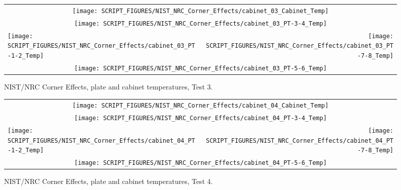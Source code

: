 \begin{figure}[p]
\begin{tabular*}{\textwidth}{l@{\extracolsep{\fill}}r}
\multicolumn{2}{c}{\texttt{[image: SCRIPT\_FIGURES/NIST\_NRC\_Corner\_Effects/cabinet\_03\_Cabinet\_Temp]}} \\
\multicolumn{2}{c}{\texttt{[image: SCRIPT\_FIGURES/NIST\_NRC\_Corner\_Effects/cabinet\_03\_PT-3-4\_Temp]}} \\
\texttt{[image: SCRIPT\_FIGURES/NIST\_NRC\_Corner\_Effects/cabinet\_03\_PT-1-2\_Temp]} &
\texttt{[image: SCRIPT\_FIGURES/NIST\_NRC\_Corner\_Effects/cabinet\_03\_PT-7-8\_Temp]} \\
\multicolumn{2}{c}{\texttt{[image: SCRIPT\_FIGURES/NIST\_NRC\_Corner\_Effects/cabinet\_03\_PT-5-6\_Temp]}}
\end{tabular*}
\caption[NIST/NRC Corner Effects, plate and cabinet temperatures, Test 3]{NIST/NRC Corner Effects, plate and cabinet temperatures, Test 3.}
\label{NIST_NRC_Cabinet_PT_Test_3}
\end{figure}

\begin{figure}[p]
\begin{tabular*}{\textwidth}{l@{\extracolsep{\fill}}r}
\multicolumn{2}{c}{\texttt{[image: SCRIPT\_FIGURES/NIST\_NRC\_Corner\_Effects/cabinet\_04\_Cabinet\_Temp]}} \\
\multicolumn{2}{c}{\texttt{[image: SCRIPT\_FIGURES/NIST\_NRC\_Corner\_Effects/cabinet\_04\_PT-3-4\_Temp]}} \\
\texttt{[image: SCRIPT\_FIGURES/NIST\_NRC\_Corner\_Effects/cabinet\_04\_PT-1-2\_Temp]} &
\texttt{[image: SCRIPT\_FIGURES/NIST\_NRC\_Corner\_Effects/cabinet\_04\_PT-7-8\_Temp]} \\
\multicolumn{2}{c}{\texttt{[image: SCRIPT\_FIGURES/NIST\_NRC\_Corner\_Effects/cabinet\_04\_PT-5-6\_Temp]}}
\end{tabular*}
\caption[NIST/NRC Corner Effects, plate and cabinet temperatures, Test 4]{NIST/NRC Corner Effects, plate and cabinet temperatures, Test 4.}
\label{NIST_NRC_Cabinet_PT_Test_4}
\end{figure}

